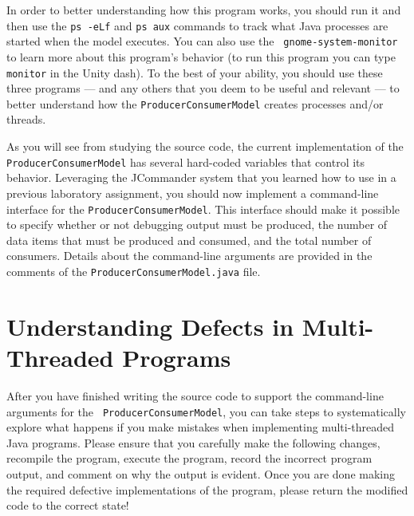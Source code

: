 In order to better understanding how this program works, you should run it and then use the {\tt ps -eLf} and {\tt ps
  aux} commands to track what Java processes are started when the model executes. You can also use the {\tt
  gnome-system-monitor} to learn more about this program's behavior (to run this program you can type {\tt monitor} in
the Unity dash).  To the best of your ability, you should use these three programs --- and any others that you deem to
be useful and relevant --- to better understand how the {\tt ProducerConsumerModel} creates processes and/or threads.

\begin{sloppypar} As you will see from studying the source code, the current implementation of the {\tt
    ProducerConsumerModel} has several hard-coded variables that control its behavior. Leveraging the JCommander system
  that you learned how to use in a previous laboratory assignment, you should now implement a command-line interface for
  the {\tt ProducerConsumerModel}.  This interface should make it possible to specify whether or not debugging output
  must be produced, the number of data items that must be produced and consumed, and the total number of consumers.
  Details about the command-line arguments are provided in the comments of the {\tt ProducerConsumerModel.java} file.
\end{sloppypar}

\section*{Understanding Defects in Multi-Threaded Programs}

After you have finished writing the source code to support the command-line arguments for the {\tt
  ProducerConsumerModel}, you can take steps to systematically explore what happens if you make mistakes when
implementing multi-threaded Java programs.  Please ensure that you carefully make the following changes, recompile the
program, execute the program, record the incorrect program output, and comment on why the output is evident.  Once you
are done making the required defective implementations of the program, please return the modified code to the correct
state!

